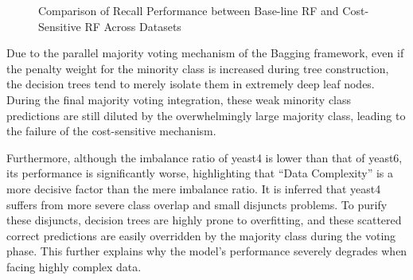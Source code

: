 \documentclass[sigconf]{acmart}
\begin{document}
\begin{figure}[h]
  \centering
  \caption{Comparison of Recall Performance between Base-line RF and Cost-Sensitive RF Across Datasets}
  \label{fig:rf_recall_compare}
\end{figure}

Due to the parallel majority voting mechanism of the Bagging framework, even if the penalty weight for the minority class is increased during tree construction, the decision trees tend to merely isolate them in extremely deep leaf nodes. During the final majority voting integration, these weak minority class predictions are still diluted by the overwhelmingly large majority class, leading to the failure of the cost-sensitive mechanism. 

Furthermore, although the imbalance ratio of yeast4 is lower than that of yeast6, its performance is significantly worse, highlighting that ``Data Complexity'' is a more decisive factor than the mere imbalance ratio. It is inferred that yeast4 suffers from more severe class overlap and small disjuncts problems. To purify these disjuncts, decision trees are highly prone to overfitting, and these scattered correct predictions are easily overridden by the majority class during the voting phase. This further explains why the model's performance severely degrades when facing highly complex data. 
\end{document}
